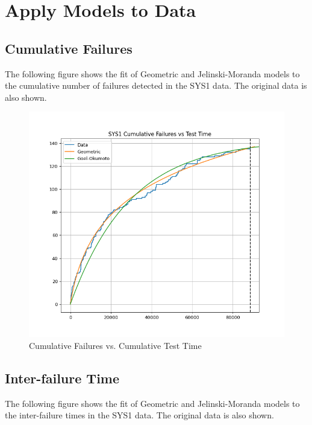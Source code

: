 \documentclass{article}
\begin{document}
\newpage



\section{Apply Models to Data}
\subsection{Cumulative Failures}
The following figure shows the fit of Geometric and Jelinski-Moranda models to the cumulative number of failures detected in the SYS1 data. The original data is also shown.



\begin{figure}[h!]
\centering
\includegraphics[width=\textwidth]{cfplot2.png}
\caption{Cumulative Failures vs. Cumulative Test Time}
\label{fig:mcfplot}
\end{figure}



\newpage

\subsection{Inter-failure Time}
The following figure shows the fit of Geometric and Jelinski-Moranda models to the inter-failure times in the SYS1 data. The original data is also shown.
\end{document}
